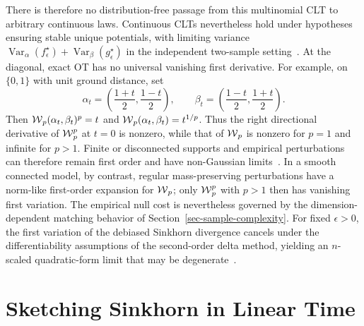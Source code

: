 There is therefore no distribution-free passage from this multinomial CLT to arbitrary continuous laws. Continuous CLTs nevertheless hold under hypotheses ensuring stable unique potentials, with limiting variance \(\operatorname{Var}_\alpha(f_\epsilon^\star)+\operatorname{Var}_\beta(g_\epsilon^\star)\) in the independent two-sample setting~\cite{delBarrioLoubes2017clt,delBarrioGonzalezSanzLoubes2021central,mena2019statistical,gonzalezSanzHundrieser2023weak}. At the diagonal, exact OT has no universal vanishing first derivative. For example, on $\{0,1\}$ with unit ground distance, set
\[
	\alpha_t=\left(\frac{1+t}{2},\frac{1-t}{2}\right),
	\qquad
	\beta_t=\left(\frac{1-t}{2},\frac{1+t}{2}\right).
\]
Then $\operatorname{\mathcal{W}}_p(\alpha_t,\beta_t)^p=t$ and $\operatorname{\mathcal{W}}_p(\alpha_t,\beta_t)=t^{1/p}$. Thus the right directional derivative of $\operatorname{\mathcal{W}}_p^p$ at $t=0$ is nonzero, while that of $\operatorname{\mathcal{W}}_p$ is nonzero for $p=1$ and infinite for $p>1$. Finite or disconnected supports and empirical perturbations can therefore remain first order and have non-Gaussian limits~\cite{sommerfeld2018inference}. In a smooth connected model, by contrast, regular mass-preserving perturbations have a norm-like first-order expansion for $\operatorname{\mathcal{W}}_p$; only $\operatorname{\mathcal{W}}_p^p$ with $p>1$ then has vanishing first variation. The empirical null cost is nevertheless governed by the dimension-dependent matching behavior of Section~\ref{sec-sample-complexity}. For fixed $\epsilon>0$, the first variation of the debiased Sinkhorn divergence cancels under the differentiability assumptions of the second-order delta method, yielding an $n$-scaled quadratic-form limit that may be degenerate~\cite{goldfeld2022limit}.


\section{Sketching Sinkhorn in Linear Time}
\label{sec-sketching-sinkhorn}

